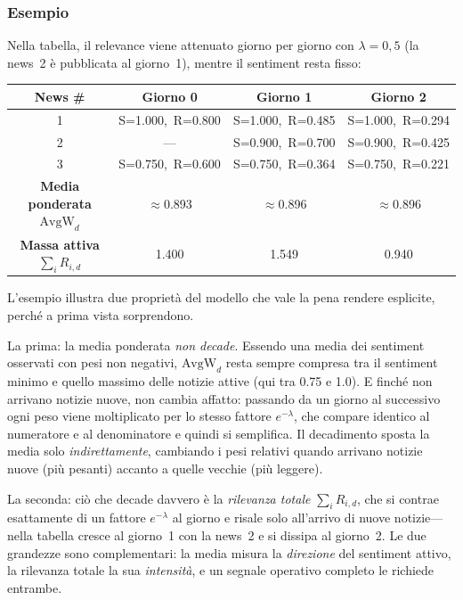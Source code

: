 \subsubsection*{Esempio}

Nella tabella, il relevance viene attenuato giorno per giorno con $\lambda = 0{,}5$ (la news~2 è pubblicata al giorno~1), mentre il sentiment resta fisso:

\begin{center}
\renewcommand{\arraystretch}{1.4}
\begin{tabular}{|c|c|c|c|}
\hline
\textbf{News \#} & \textbf{Giorno 0} & \textbf{Giorno 1} & \textbf{Giorno 2} \\
\hline
1 & S=1.000,\ R=0.800 & S=1.000,\ R=0.485 & S=1.000,\ R=0.294 \\
2 & ---               & S=0.900,\ R=0.700 & S=0.900,\ R=0.425 \\
3 & S=0.750,\ R=0.600 & S=0.750,\ R=0.364 & S=0.750,\ R=0.221 \\
\hline
\textbf{Media ponderata $\text{AvgW}_d$} & $\approx$0.893 & $\approx$0.896 & $\approx$0.896 \\
\hline
\textbf{Massa attiva $\sum_i R_{i,d}$} & 1.400 & 1.549 & 0.940 \\
\hline
\end{tabular}
\end{center}

L'esempio illustra due proprietà del modello che vale la pena rendere esplicite, perché a prima vista sorprendono.

La prima: la media ponderata \emph{non decade}.
Essendo una media dei sentiment osservati con pesi non negativi, $\text{AvgW}_d$ resta sempre compresa tra il sentiment minimo e quello massimo delle notizie attive (qui tra 0.75 e 1.0).
E finché non arrivano notizie nuove, non cambia affatto: passando da un giorno al successivo ogni peso viene moltiplicato per lo stesso fattore $e^{-\lambda}$, che compare identico al numeratore e al denominatore e quindi si semplifica.
Il decadimento sposta la media solo \emph{indirettamente}, cambiando i pesi relativi quando arrivano notizie nuove (più pesanti) accanto a quelle vecchie (più leggere).

La seconda: ciò che decade davvero è la \emph{rilevanza totale} $\sum_i R_{i,d}$, che si contrae esattamente di un fattore $e^{-\lambda}$ al giorno e risale solo all'arrivo di nuove notizie---nella tabella cresce al giorno~1 con la news~2 e si dissipa al giorno~2.
Le due grandezze sono complementari: la media misura la \emph{direzione} del sentiment attivo, la rilevanza totale la sua \emph{intensità}, e un segnale operativo completo le richiede entrambe.

